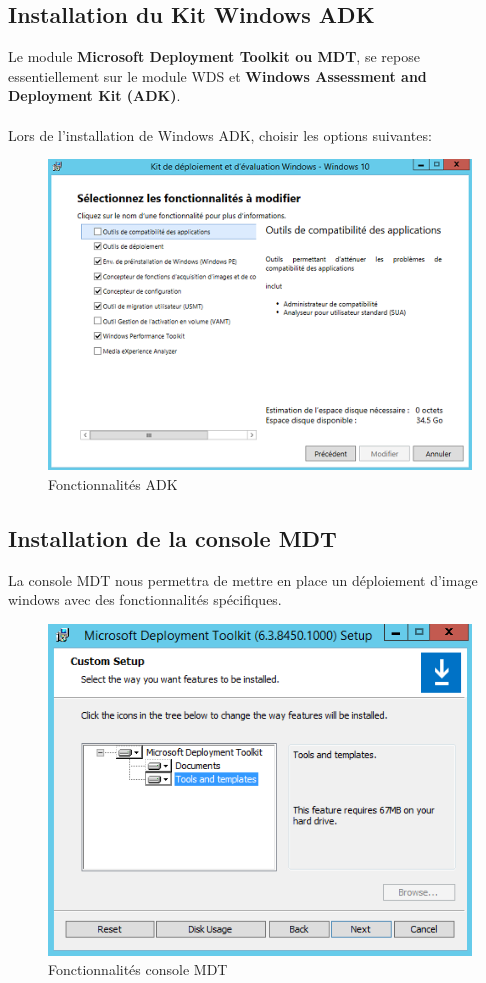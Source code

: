 \documentclass[11pt,a4paper,oneside]{article}
\begin{document}
\subsection{Installation du Kit Windows ADK}
 Le module \textbf{Microsoft Deployment Toolkit ou MDT}, se repose essentiellement sur le module WDS et \textbf{Windows Assessment and Deployment Kit (ADK)}. \\ \\
 Lors de l'installation de Windows ADK, choisir les options suivantes:
\begin{figure}[hbtp]
\centering
\includegraphics[scale=0.7]{Pictures/MDT/MDT1.png}
\caption{\label{etiquette} Fonctionnalités ADK}
\end{figure}

\subsection{Installation de la console MDT}
La console MDT nous permettra de mettre en place un déploiement d'image windows avec des fonctionnalités spécifiques.
\begin{figure}[hbtp]
\centering
\includegraphics[scale=0.7]{Pictures/MDT/MDT2.png}
\caption{\label{etiquette} Fonctionnalités console MDT}
\end{figure}
\end{document}
